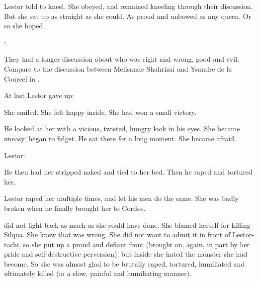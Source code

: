 Lestor told \Delphine{} to kneel. 
She obeyed, and remained kneeling through their discussion. 
But she sat up as straight as she could. 
As proud and unbowed as any queen. 
Or so she hoped. 

\Delphine: 

They had a longer discussion about who was right and wrong, good and evil. 
Compare to the discussion between Melisande Shahrizai and Ysandre de la Courcel in \cite[p.622]{JacquelineCarey:KushielsAvatar}. 

At last Lestor gave up: 

She smiled. 
She felt happy inside. 
She had won a small victory. 

He looked at her with a vicious, twisted, hungry look in his eyes. 
She became uneasy, began to fidget. 
He sat there for a long moment. 
She became afraid. 

Lestor: 

He then had her stripped naked and tied to her bed. 
Then he raped and tortured her. 



Lestor raped her multiple times, and let his men do the same. 
She was badly broken when he finally brought her to Cordos. 

\Delphine{} did not fight back as much as she could have done. 
She blamed herself for killing Silqua. 
She knew that was wrong. 
She did not want to admit it in front of Lestor-tachi, so she put up a proud and defiant front (brought on, again, in part by her pride and self-destructive perversion), but inside she hated the monster she had become. 
So she was almost glad to be brutally raped, tortured, humiliated and ultimately killed (in a slow, painful and humiliating manner). 










